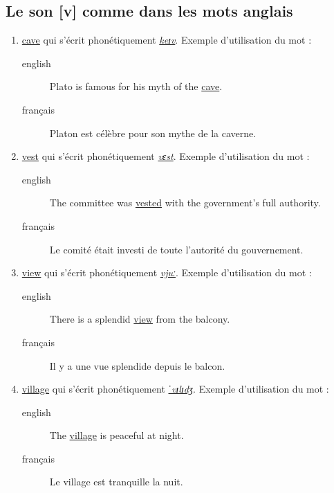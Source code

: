 \subsection{Le son [v] comme dans les mots anglais}
\label{sec:org1c51acc}
\begin{enumerate}
\item \href{http://www.wordreference.com/enfr/cave}{cave} qui s'écrit phonétiquement \href{https://en.oxforddictionaries.com/definition/cave}{\emph{keɪv}}. Exemple d'utilisation du mot :
\begin{description}
\item[{english}] \textenglish{Plato is famous for his myth of the \href{https://youtu.be/kZQbkzwwinI}{cave}.}
\item[{français}] Platon est célèbre pour son mythe de la caverne.
\end{description}
\item \href{http://www.wordreference.com/enfr/vest}{vest} qui s'écrit phonétiquement \href{https://en.oxforddictionaries.com/definition/vest}{\emph{vɛst}}. Exemple d'utilisation du mot :
\begin{description}
\item[{english}] \textenglish{The committee was \href{https://youtu.be/E4cjvxydHuU}{vested} with the government's full
authority.}
\item[{français}] Le comité était investi de toute l'autorité du
gouvernement.
\end{description}
\item \href{http://www.wordreference.com/enfr/view}{view} qui s'écrit phonétiquement \href{https://en.oxforddictionaries.com/definition/view}{\emph{vjuː}}. Exemple d'utilisation du mot :
\begin{description}
\item[{english}] \textenglish{There is a splendid \href{https://youtu.be/gODvA\_SdXCY}{view} from the balcony.}
\item[{français}] Il y a une vue splendide depuis le balcon.
\end{description}
\item \href{http://www.wordreference.com/enfr/village}{village} qui s'écrit phonétiquement \href{https://en.oxforddictionaries.com/definition/village}{\emph{ˈvɪlɪdʒ}}. Exemple d'utilisation du mot :
\begin{description}
\item[{english}] \textenglish{The \href{https://youtu.be/Xq8mt6WuD-E}{village} is peaceful at night.}
\item[{français}] Le village est tranquille la nuit.
\end{description}
\end{enumerate}
